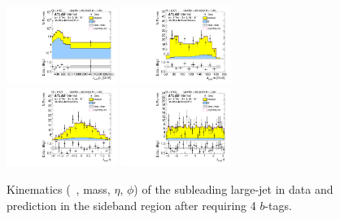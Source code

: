 \begin{figure}[htbp!]
\begin{center}
\includegraphics[width=0.32\textwidth,angle=-90]{figures/boosted/Sideband/b77_FourTag_Sideband_sublHCand_Pt_m_1.pdf}
\includegraphics[width=0.32\textwidth,angle=-90]{figures/boosted/Sideband/b77_FourTag_Sideband_sublHCand_Mass_s.pdf}\\
\includegraphics[width=0.32\textwidth,angle=-90]{figures/boosted/Sideband/b77_FourTag_Sideband_sublHCand_Eta.pdf}
\includegraphics[width=0.32\textwidth,angle=-90]{figures/boosted/Sideband/b77_FourTag_Sideband_sublHCand_Phi.pdf}
  \caption{Kinematics (\pt~, mass, $\eta$, $\phi$) of the subleading large-\R jet in data and prediction in the sideband region after requiring 4 $b$-tags.}
  \label{fig:boosted-4b-sideband-ak10-subl}
\end{center}
\end{figure}

